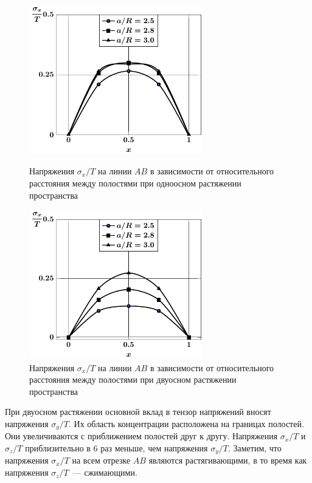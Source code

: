 \begin{figure}[h!]
\centering\footnotesize
\parbox[b]{7.5cm}{\centering\includegraphics[width=7.5cm]{cav4-a-d95-t1-sig_x.pdf}
\caption{Напряжения $\sigma_x/T$ на линии $AB$ в зависимости от относительного расстояния между полостями при одноосном растяжении пространства
\label{f:8:101}}}\hfil\hfil
\parbox[b]{7.5cm}{\centering\includegraphics[width=7.5cm]{cav4-a-d95-t2-sig_x.pdf}
\caption{Напряжения $\sigma_x/T$ на линии $AB$ в зависимости от относительного расстояния между полостями при двуосном растяжении пространства
\label{f:8:102}}}
\end{figure}

При двуосном растяжении основной вклад в тензор напряжений вносят напряжения $\sigma_y/T$. Их область концентрации расположена на границах полостей. Они увеличиваются с приближением полостей друг к другу. Напряжения $\sigma_x/T$ и $\sigma_z/T$ приблизительно в 6 раз меньше, чем напряжения $\sigma_y/T$. Заметим, что  напряжения $\sigma_x/T$ на всем отрезке $AB$ являются растягивающими, в то время как  напряжения $\sigma_z/T$~--- сжимающими.

